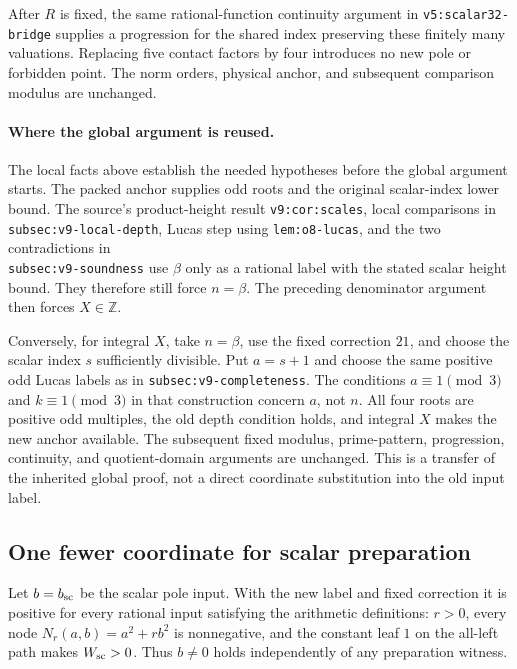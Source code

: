 After $R$ is fixed, the same rational-function continuity argument in
\nolinkurl{v5:scalar32-bridge} supplies a progression for the shared index
preserving these finitely many valuations. Replacing five contact factors
by four introduces no new pole or forbidden point. The norm orders,
physical anchor, and subsequent comparison modulus are unchanged.

\paragraph{Where the global argument is reused.}
The local facts above establish the needed hypotheses before the global
argument starts. The packed anchor supplies odd roots and the original
scalar-index lower bound. The source's product-height result
\nolinkurl{v9:cor:scales}, local comparisons in
\nolinkurl{subsec:v9-local-depth}, Lucas step using
\nolinkurl{lem:o8-lucas}, and the two contradictions in\\
\nolinkurl{subsec:v9-soundness} use $\beta$ only as a rational label with
the stated scalar height bound. They therefore still force $n=\beta$.
The preceding denominator argument then forces $X\in\mathbb Z$.

Conversely, for integral $X$, take $n=\beta$, use the fixed correction
$21$, and choose the scalar index $s$ sufficiently divisible. Put
$a=s+1$ and choose the same positive odd Lucas labels as in
\nolinkurl{subsec:v9-completeness}. The conditions $a\equiv1\pmod3$
and $k\equiv1\pmod3$ in that construction concern $a$, not $n$.
All four roots are positive odd multiples, the old depth condition holds,
and integral $X$ makes the new anchor available. The subsequent fixed
modulus, prime-pattern, progression, continuity, and quotient-domain
arguments are unchanged. This is a transfer of the inherited global
proof, not a direct coordinate substitution into the old input label.

\subsection{One fewer coordinate for scalar preparation}

Let $b=b_{\rm sc}$ be the scalar pole input. With the new label and fixed
correction it is positive for every rational input satisfying the
arithmetic definitions: $r>0$, every node
$N_r(a,b)=a^2+rb^2$ is nonnegative, and the constant leaf $1$ on the
all-left path makes $W_{\rm sc}>0$. Thus $b\ne0$ holds independently
of any preparation witness.

